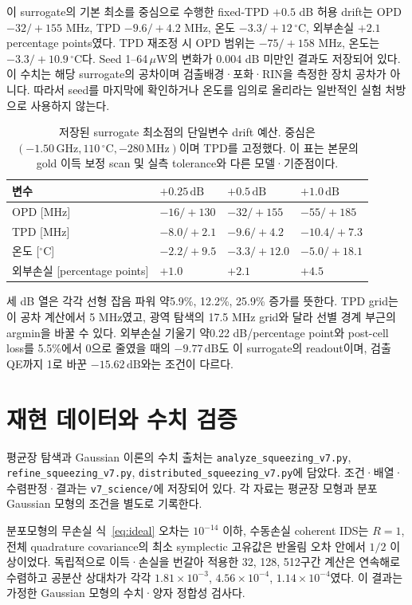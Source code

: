 \documentclass[11pt,a4paper]{article}
\newcommand{\dB}{\,\mathrm{dB}}
\newcommand{\code}[1]{\nolinkurl{#1}}
\begin{document}
이 surrogate의 기본 최소를 중심으로 수행한 fixed-TPD $+0.5$ dB
허용 drift는 OPD $-32/+155$ MHz, TPD $-9.6/+4.2$ MHz, 온도
$-3.3/+12$\,$^\circ$C, 외부손실 $+2.1$ percentage points였다.
TPD 재조정 시 OPD 범위는 $-75/+158$ MHz, 온도는 $-3.3/+10.9$\,$^\circ$C다.
Seed 1--64\,$\mu$W의 변화가 0.004 dB 미만인 결과도 저장되어 있다.
이 수치는 해당 surrogate의 공차이며 검출배경·포화·RIN을 측정한
장치 공차가 아니다. 따라서 seed를 마지막에 확인하거나 온도를
임의로 올리라는 일반적인 실험 처방으로 사용하지 않는다.

\begin{table}[htbp]\centering\small
\caption{저장된 surrogate 최소점의 단일변수 drift 예산. 중심은
$(-1.50\,\mathrm{GHz},110\,^{\circ}\mathrm C,-280\,\mathrm{MHz})$이며
TPD를 고정했다. 이 표는 본문의 gold 이득 보정 scan 및 실측 tolerance와
다른 모델·기준점이다.}\label{tab:surrogatetol}
\begin{tabularx}{\linewidth}{P{3.3cm}YYY}
\toprule 변수 & $+0.25\dB$ & $+0.5\dB$ & $+1.0\dB$\\\midrule
OPD [MHz] & $-16/+130$ & $-32/+155$ & $-55/+185$\\
TPD [MHz] & $-8.0/+2.1$ & $-9.6/+4.2$ & $-10.4/+7.3$\\
온도 [$^\circ$C] & $-2.2/+9.5$ & $-3.3/+12.0$ & $-5.0/+18.1$\\
외부손실 [percentage points] & $+1.0$ & $+2.1$ & $+4.5$\\
\bottomrule
\end{tabularx}
\end{table}
세 dB 열은 각각 선형 잡음 파워 약5.9\%, 12.2\%, 25.9\% 증가를
뜻한다. TPD grid는 이 공차 계산에서 5 MHz였고, 광역 탐색의
17.5 MHz grid와 달라 선별 경계 부근의 argmin을 바꿀 수 있다.
외부손실 기울기 약0.22 dB/percentage point와 post-cell loss를
5.5\%에서 0으로 줄였을 때의 $-9.77\dB$도 이 surrogate의 readout이며,
검출 QE까지 1로 바꾼 $-15.62\dB$와는 조건이 다르다.

\section{재현 데이터와 수치 검증}
평균장 탐색과 Gaussian 이론의 수치 출처는 \code{analyze_squeezing_v7.py},
\code{refine_squeezing_v7.py}, \code{distributed_squeezing_v7.py}에 담았다.
조건·배열·수렴판정·결과는 \code{v7_science/}에 저장되어 있다.
각 자료는 평균장 모형과 분포 Gaussian 모형의 조건을 별도로 기록한다.

분포모형의 무손실 식~\eqref{eq:ideal} 오차는 $10^{-14}$ 이하,
수동손실 coherent IDS는 $R=1$, 전체 quadrature covariance의 최소
symplectic 고유값은 반올림 오차 안에서 $1/2$ 이상이었다.
독립적으로 이득·손실을 번갈아 적용한 32, 128, 512구간 계산은 연속해로
수렴하고 공분산 상대차가 각각 $1.81\times10^{-3}$,
$4.56\times10^{-4}$, $1.14\times10^{-4}$였다.
이 결과는 가정한 Gaussian 모형의 수치·양자 정합성 검사다.
\end{document}
